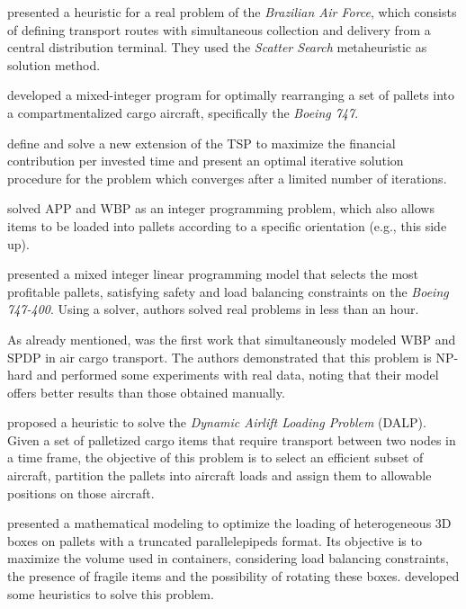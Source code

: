 \documentclass[preprint,authoryear]{elsarticle}
\begin{document}
\cite{MesquitaCunha2011} presented a heuristic for a real problem of the {\it Brazilian Air Force}, which consists of defining transport routes with simultaneous collection and delivery from a central distribution terminal. They used the {\it Scatter Search} metaheuristic as solution method.

\cite{Limbourg2012} developed a mixed-integer program for optimally rearranging a set of pallets into a compartmentalized cargo aircraft, specifically the {\it Boeing 747}.

\cite{kaspi2019} define and solve a new extension of the TSP to maximize the financial contribution per invested time and present an optimal iterative solution procedure for the problem which converges after a limited number of iterations.

\cite{RoesenerHall2014} solved APP and WBP as an integer programming problem, which also allows items to be loaded into pallets according to a specific orientation (e.g., this side up).

\cite{Vancroonemburg2014} presented a mixed integer linear programming model that selects the most profitable pallets, satisfying safety and load balancing constraints on the {\it Boeing 747-400}. Using a solver, authors solved real problems in less than an hour.

As already mentioned, \cite{LurkinSchyns2015} was the first work that simultaneously modeled WBP and SPDP in air cargo transport. The authors demonstrated that this problem is NP-hard and performed some experiments with real data, noting that their model offers better results than those obtained manually.

\cite{RoesenerBarnes2016} proposed a heuristic to solve the {\it Dynamic Airlift Loading Problem} (DALP). Given a set of palletized cargo items that require transport between two nodes in a time frame, the objective of this problem is to select an efficient subset of aircraft, partition the pallets into aircraft loads and assign them to allowable positions on those aircraft.

\cite{PaquaySchynsLimbourg2016} presented a mathematical modeling to optimize the loading of heterogeneous 3D boxes on pallets with a truncated parallelepipeds format. Its objective is to maximize the volume used in containers, considering load balancing constraints, the presence of fragile items and the possibility of rotating these boxes. \cite{PaquayLimbourgSchynsOliveira2018} developed some heuristics to solve this problem.
\end{document}
